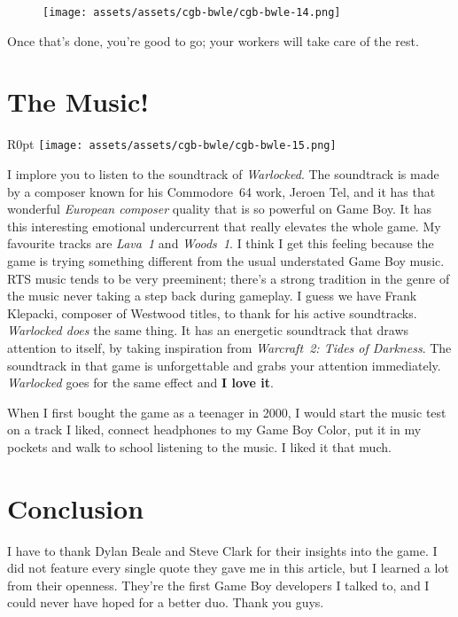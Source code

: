 \documentclass{book}
\begin{document}
\begin{figure}[hbt]
\vskip 10pt
\centering \texttt{[image: assets/assets/cgb-bwle/cgb-bwle-14.png]}
\vskip 6pt
\end{figure}

Once that’s done, you’re good to go; your workers will take care of the rest.

\FloatBarrier\needspace{5pt}\section*{The Music!}\nopagebreak[4]

\begin{wrapfigure}{R}{0pt} \texttt{[image: assets/assets/cgb-bwle/cgb-bwle-15.png]}\end{wrapfigure}
I implore you to listen to the soundtrack of \emph{Warlocked}. The soundtrack is made by a composer known for his Commodore 64 work, Jeroen Tel, and it has that wonderful \emph{European composer} quality that is so powerful on Game Boy. It has this interesting emotional undercurrent that really elevates the whole game. My favourite tracks are \emph{Lava 1} and \emph{Woods 1}. I think I get this feeling because the game is trying something different from the usual understated Game Boy music. RTS music tends to be very preeminent; there’s a strong tradition in the genre of the music never taking a step back during gameplay. I guess we have Frank Klepacki, composer of Westwood titles, to thank for his active soundtracks. \emph{Warlocked does} the same thing. It has an energetic soundtrack that draws attention to itself, by taking inspiration from \emph{Warcraft 2: Tides of Darkness}. The soundtrack in that game is unforgettable and grabs your attention immediately. \emph{Warlocked} goes for the same effect and \textbf{I love it}.

When I first bought the game as a teenager in 2000, I would start the music test on a track I liked, connect headphones to my Game Boy Color, put it in my pockets and walk to school listening to the music. I liked it that much.

\FloatBarrier\needspace{5pt}\section*{Conclusion}\nopagebreak[4]

I have to thank Dylan Beale and Steve Clark for their insights into the game. I did not feature every single quote they gave me in this article, but I learned a lot from their openness. They’re the first Game Boy developers I talked to, and I could never have hoped for a better duo. Thank you guys.
\end{document}
